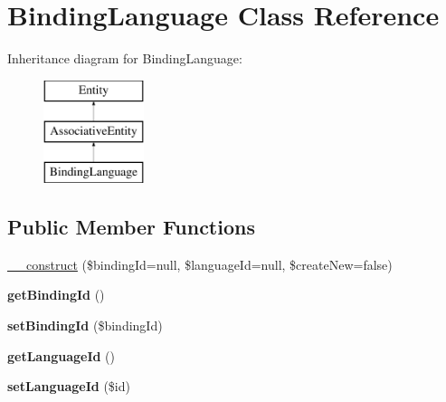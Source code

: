 \hypertarget{classBindingLanguage}{
\section{BindingLanguage Class Reference}
\label{classBindingLanguage}
}
Inheritance diagram for BindingLanguage:\begin{figure}[H]
\begin{center}
\leavevmode
\includegraphics[height=3.000000cm]{classBindingLanguage}
\end{center}
\end{figure}
\subsection*{Public Member Functions}
\begin{DoxyCompactItemize}
\item 
\hyperlink{classBindingLanguage_a82d72a86b098f9d6ee3d11412f566674}{\_\-\_\-construct} (\$bindingId=null, \$languageId=null, \$createNew=false)
\item 
\hypertarget{classBindingLanguage_a3ddbcd10fe8a242eeac058c4f37b2363}{
{\bfseries getBindingId} ()}
\label{classBindingLanguage_a3ddbcd10fe8a242eeac058c4f37b2363}

\item 
\hypertarget{classBindingLanguage_a1466d54d63341b0b1097e0a7d772de41}{
{\bfseries setBindingId} (\$bindingId)}
\label{classBindingLanguage_a1466d54d63341b0b1097e0a7d772de41}

\item 
\hypertarget{classBindingLanguage_a128bbc4c6acaec2dc54f77b7d7e77d38}{
{\bfseries getLanguageId} ()}
\label{classBindingLanguage_a128bbc4c6acaec2dc54f77b7d7e77d38}

\item 
\hypertarget{classBindingLanguage_a049a0c51d0b71ce2235f6a87052f2107}{
{\bfseries setLanguageId} (\$id)}
\label{classBindingLanguage_a049a0c51d0b71ce2235f6a87052f2107}

\end{DoxyCompactItemize}
